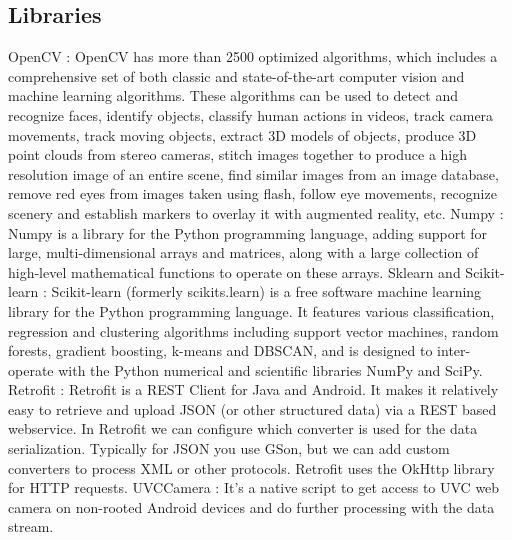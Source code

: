 \documentclass{fisatproject}
\begin{document}
\subsection{Libraries}
OpenCV : OpenCV has more than 2500 optimized algorithms, which includes a comprehensive set of both classic and state-of-the-art computer vision and machine learning algorithms. These algorithms can be used to detect and recognize faces, identify objects, classify human actions in videos, track camera movements, track moving objects, extract 3D models of objects, produce 3D point clouds from stereo cameras, stitch images together to produce a high resolution image of an entire scene, find similar images from an image database, remove red eyes from images taken using flash, follow eye movements, recognize scenery and establish markers to overlay it with augmented reality, etc.\cite{g}\newline\newline
Numpy : Numpy is a library for the Python programming language, adding support for large, multi-dimensional arrays and matrices, along with a large collection of high-level mathematical functions to operate on these arrays.\cite{g}\newline\newline
Sklearn and Scikit-learn : Scikit-learn (formerly scikits.learn) is a free software machine learning library for the Python programming language. It features various classification, regression and clustering algorithms including support vector machines, random forests, gradient boosting, k-means and DBSCAN, and is designed to inter-operate with the Python numerical and scientific libraries NumPy and SciPy.\cite{j}\newline\newline
Retrofit : Retrofit is a REST Client for Java and Android. It makes it relatively easy to retrieve and upload JSON (or other structured data) via a REST based webservice. In Retrofit we can configure which converter is used for the data serialization. Typically for JSON you use GSon, but we can add custom converters to process XML or other protocols. Retrofit uses the OkHttp library for HTTP requests.\cite{k}\newline\newline
UVCCamera : It's a native script to get access to UVC web camera on non-rooted Android devices and do further processing with the data stream.\cite{k}
\newline\newline
\end{document}
